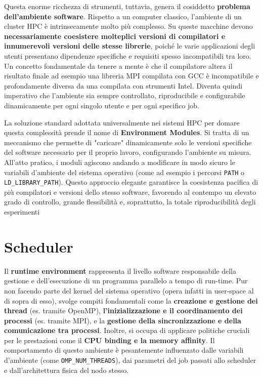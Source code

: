 Questa enorme ricchezza di strumenti, tuttavia, genera il cosiddetto \textbf{problema dell'ambiente software}. Rispetto a un computer classico, l'ambiente di un cluster HPC è intrinsecamente molto più complesso. Su queste macchine devono \textbf{necessariamente coesistere molteplici versioni di compilatori e innumerevoli versioni delle stesse librerie}, poiché le varie applicazioni degli utenti presentano dipendenze specifiche e requisiti spesso incompatibili tra loro. Un concetto fondamentale da tenere a mente è che il compilatore altera il risultato finale ad esempio una libreria MPI compilata con GCC è incompatibile e profondamente diversa da una compilata con strumenti Intel. Diventa quindi imperativo che l'ambiente sia sempre controllato, riproducibile e configurabile dinamicamente per ogni singolo utente e per ogni specifico job.

La soluzione standard adottata universalmente nei sistemi HPC per domare questa complessità prende il nome di \textbf{Environment Modules}. Si tratta di un meccanismo che permette di "caricare" dinamicamente solo le versioni specifiche del software necessario per il proprio lavoro, configurando l'ambiente su misura. All'atto pratico, i moduli agiscono andando a modificare in modo sicuro le variabili d'ambiente del sistema operativo (come ad esempio i percorsi \texttt{PATH} o \texttt{LD\_LIBRARY\_PATH}). Questo approccio elegante garantisce la coesistenza pacifica di più compilatori e versioni dello stesso software, favorendo al contempo un elevato grado di controllo, grande flessibilità e, soprattutto, la totale riproducibilità degli esperimenti 

\section{Scheduler}
Il \textbf{runtime environment} rappresenta il livello software responsabile della gestione e dell'esecuzione di un programma parallelo a tempo di run-time. Pur non facendo parte del kernel del sistema operativo (opera infatti in user-space al di sopra di esso), svolge compiti fondamentali come la \textbf{creazione e gestione dei thread} (es. tramite OpenMP), \textbf{l'inizializzazione e il coordinamento dei processi} (es. tramite MPI), e la \textbf{gestione della sincronizzazione e della comunicazione tra processi}. Inoltre, si occupa di applicare politiche cruciali per le prestazioni come il \textbf{CPU binding e la memory affinity}. Il comportamento di questo ambiente è pesantemente influenzato dalle variabili d'ambiente (come \texttt{OMP\_NUM\_THREADS}), dai parametri del job passati allo scheduler e dall'architettura fisica del nodo stesso.


